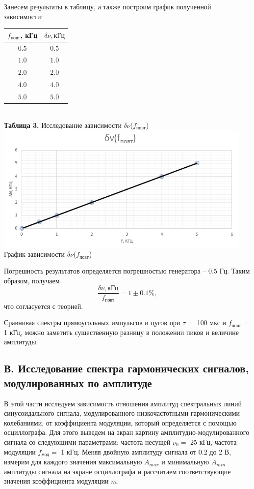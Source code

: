 \documentclass[a4paper,12pt]{article} %
\begin{document}
\hfill \break Занесем результаты в таблицу, а также построим график полученной зависимости:

\begin{center}
\begin{tabular}{|c|c|}\hline
$f_\text{повт}$, кГц&$\delta\nu, \text{кГц}$\\\hline
$0.5$&$0.5$\\\hline
$1.0$&$1.0$\\\hline
$2.0$&$2.0$\\\hline
$4.0$&$4.0$\\\hline
$5.0$&$5.0$\\\hline
\end{tabular}\\
\hfill \break \textbf {Таблица 3.} Исследование зависимости $\delta \nu$($f_\text{повт}$)\\
\includegraphics[width=0.95\textwidth]{19.png}\\
График зависимости $\delta \nu$($f_\text{повт}$)~\\
\end{center}

\hfill \break Погрешность результатов определяется погрешностью генератора -- $0.5$ Гц. Таким образом, получаем
$$\frac{\delta\nu, \text{кГц}}{f_\text{повт}} = 1\pm0.1\%,$$
что согласуется с теорией.

\hfill \break Сравнивая спектры прямоугольных импульсов и цугов при $\tau = $ 100 мкс и $f_\text{повт} = $ 1 кГц, можно заметить существенную разницу в положении пиков и величине амплитуды.

\subsection{В. Исследование спектра гармонических сигналов, модулированных по амплитуде}

\hfill \break В этой части исследуем зависимость отношения амплитуд спектральных линий синусоидального сигнала, модулированного низкочастотными гармоническими колебаниями, от коэффициента модуляции, который определяется с помощью осциллографа. Для этого выведем на экран картину амплитудно-модулированного сигнала со следующими параметрами: частота несущей $\nu_{0} = $ 25 кГц, частота модуляции $f_\text{мод} = $ 1 кГц. Меняя двойную амплитуду сигнала от 0.2 до 2 В, измерим для каждого значения максимальную $A_{max}$ и минимальную $A_{min}$ амплитуды сигнала на экране осциллографа и рассчитаем соответствующие значения коэффициента модуляции $m$:
\end{document}
